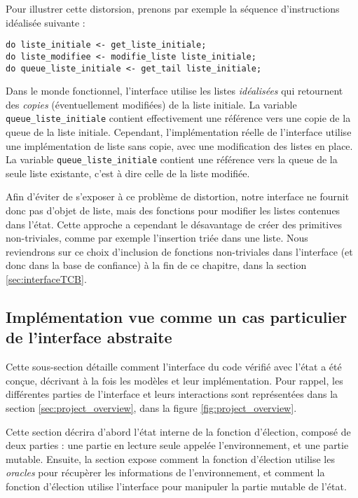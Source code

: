 Pour illustrer cette distorsion, prenons par exemple la séquence d'instructions idéalisée suivante :
\begin{verbatim}
do liste_initiale <- get_liste_initiale;
do liste_modifiee <- modifie_liste liste_initiale;
do queue_liste_initiale <- get_tail liste_initiale;
\end{verbatim}

Dans le monde fonctionnel, l'interface utilise les listes \emph{idéalisées} qui retournent des \emph{copies} (éventuellement modifiées) de la liste initiale. La variable \texttt{queue\_liste\_initiale} contient effectivement une référence vers une copie de la queue de la liste initiale. Cependant, l'implémentation réelle de l'interface utilise une implémentation de liste sans copie, avec une modification des listes en place. La variable \texttt{queue\_liste\_initiale} contient une référence vers la queue de la seule liste existante, c'est à dire celle de la liste modifiée.

Afin d'éviter de s'exposer à ce problème de distortion, notre interface ne fournit donc pas d'objet de liste, mais des fonctions pour modifier les listes contenues dans l'état. Cette approche a cependant le désavantage de créer des primitives non-triviales, comme par exemple l'insertion triée dans une liste. Nous reviendrons sur ce choix d'inclusion de fonctions non-triviales dans l'interface (et donc dans la base de confiance) à la fin de ce chapitre, dans la section \ref{sec:interfaceTCB}. 
		
		\subsection{Implémentation vue comme un cas particulier de l'interface abstraite}
	\label{sec:monad}

	Cette sous-section détaille comment l'interface du code vérifié avec l'état a été conçue, décrivant à la fois les modèles et leur implémentation.
	Pour rappel, les différentes parties de l'interface et leurs interactions sont représentées dans la section \ref{sec:project_overview}, dans la figure \ref{fig:project_overview}.

	Cette section décrira d'abord l'état interne de la fonction d'élection, composé de deux parties : une partie en lecture seule appelée l'environnement, et une partie mutable. Ensuite, la section expose comment la fonction d'élection utilise les \emph{oracles} pour récupèrer les informations de l'environnement, et comment la fonction d'élection utilise l'interface pour manipuler la partie mutable de l'état.

